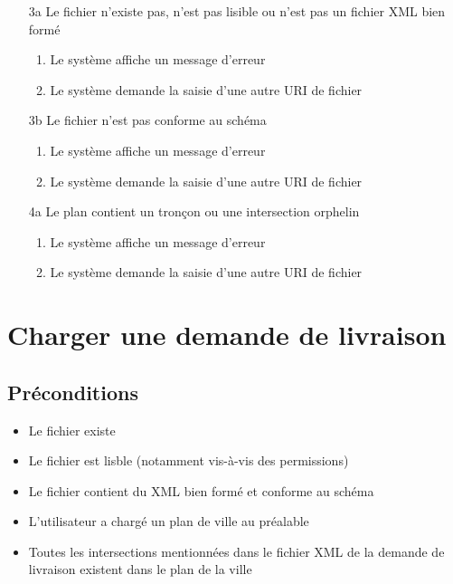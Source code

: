 \documentclass{article}
\begin{document}
\begin{itemize}
\item[3a] Le fichier n'existe pas, n'est pas lisible ou n'est pas un fichier XML bien formé
\begin{enumerate}
\item Le système affiche un message d'erreur
\item Le système demande la saisie d'une autre URI de fichier
\end{enumerate}

\item[3b] Le fichier n'est pas conforme au schéma
\begin{enumerate}
\item Le système affiche un message d'erreur
\item Le système demande la saisie d'une autre URI de fichier
\end{enumerate}

\item[4a] Le plan contient un tronçon ou une intersection orphelin
\begin{enumerate}
\item Le système affiche un message d'erreur
\item Le système demande la saisie d'une autre URI de fichier
\end{enumerate}
\end{itemize}

\section{Charger une demande de livraison}

\subsection{Préconditions}

\begin{itemize}
\item Le fichier existe
\item Le fichier est lisble (notamment vis-à-vis des permissions)
\item Le fichier contient du XML bien formé et conforme au schéma
\item L'utilisateur a chargé un plan de ville au préalable
\item Toutes les intersections mentionnées dans le fichier XML de la demande de livraison existent dans le plan de la ville
\end{itemize}
\end{document}
